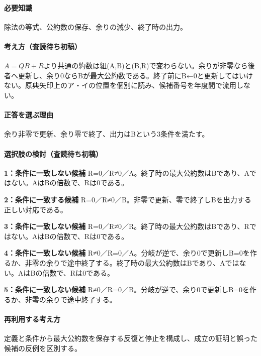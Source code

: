 \paragraph{必要知識} 除法の等式、公約数の保存、余りの減少、終了時の出力。

\paragraph{考え方（査読待ち初稿）} \(A=QB+R\)より共通の約数は組(A,B)と(B,R)で変わらない。余りが非零なら後者へ更新し、余り0ならBが最大公約数である。終了前にB←0と更新してはいけない。原典矢印上のア・イの位置を個別に読み、候補番号を年度間で流用しない。

\paragraph{正答を選ぶ理由} 余り非零で更新、余り零で終了、出力はBという3条件を満たす。

\paragraph{選択肢の検討（査読待ち初稿）}\mbox{}\par

\noindent\textbf{1：条件に一致しない候補} R=\allowbreak{}0／R≠0／A。終了時の最大公約数はBであり、Aではない。AはBの倍数で、Rは0である。\par

\noindent\textbf{2：条件に一致する候補} R=\allowbreak{}0／R≠0／B。非零で更新、零で終了しBを出力する正しい対応である。\par

\noindent\textbf{3：条件に一致しない候補} R=\allowbreak{}0／R≠0／R。終了時の最大公約数はBであり、Rではない。AはBの倍数で、Rは0である。\par

\noindent\textbf{4：条件に一致しない候補} R≠0／R=\allowbreak{}0／A。分岐が逆で、余り0で更新しB=\allowbreak{}0を作るか、非零の余りで途中終了する。終了時の最大公約数はBであり、Aではない。AはBの倍数で、Rは0である。\par

\noindent\textbf{5：条件に一致しない候補} R≠0／R=\allowbreak{}0／B。分岐が逆で、余り0で更新しB=\allowbreak{}0を作るか、非零の余りで途中終了する。\par

\paragraph{再利用する考え方} 定義と条件から最大公約数を保存する反復と停止を構成し、成立の証明と誤った候補の反例を区別する。

